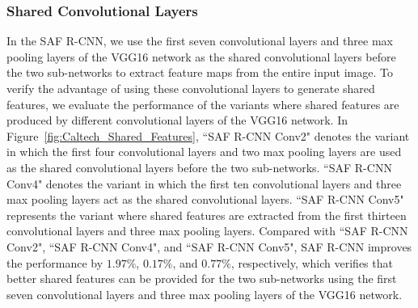 \documentclass[journal]{IEEEtran}
\begin{document}
\subsubsection{Shared Convolutional Layers}
In the SAF R-CNN, we use the first seven convolutional layers and three max pooling layers of the VGG16 network as the shared convolutional layers before the two sub-networks to extract feature maps from the entire input image. To verify the advantage of using these convolutional layers to generate shared features, we evaluate the performance of the variants where shared features are produced by different convolutional layers of the VGG16 network. In Figure~\ref{fig:Caltech_Shared_Features}, ``SAF R-CNN Conv2" denotes the variant in which the first four convolutional layers and two max pooling layers are used as the shared convolutional layers before the two sub-networks. ``SAF R-CNN Conv4" denotes the variant in which the first ten convolutional layers and three max pooling layers act as the shared convolutional layers. ``SAF R-CNN Conv5" represents the variant where shared features are extracted from the first thirteen convolutional layers and three max pooling layers. Compared with ``SAF R-CNN Conv2", ``SAF R-CNN Conv4", and ``SAF R-CNN Conv5", SAF R-CNN improves the performance by $1.97\%$, $0.17\%$, and $0.77\%$, respectively, which verifies that better shared features can be provided for the two sub-networks using the first seven convolutional layers and three max pooling layers of the VGG16 network.
\end{document}
